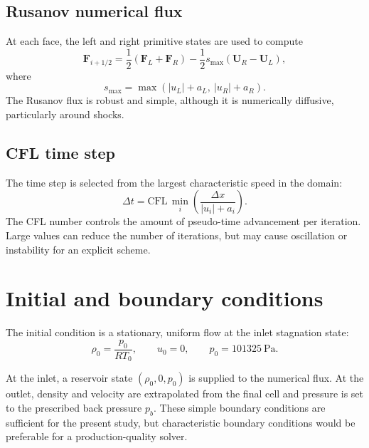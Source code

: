 \documentclass[11pt,a4paper]{article}
\begin{document}
\subsection{Rusanov numerical flux}
At each face, the left and right primitive states are used to compute
\begin{equation}
  \mathbf F_{i+1/2} = \frac{1}{2}
  \left(\mathbf F_L+\mathbf F_R\right)
  -\frac{1}{2}s_{\max}\left(\mathbf U_R-\mathbf U_L\right),
\end{equation}
where
\begin{equation}
  s_{\max}=\max\left(|u_L|+a_L,\ |u_R|+a_R\right).
\end{equation}
The Rusanov flux is robust and simple, although it is numerically diffusive,
particularly around shocks.

\subsection{CFL time step}
The time step is selected from the largest characteristic speed in the domain:
\begin{equation}
  \Delta t = \mathrm{CFL}\,
  \min_i\left(\frac{\Delta x}{|u_i|+a_i}\right).
\end{equation}
The CFL number controls the amount of pseudo-time advancement per iteration.
Large values can reduce the number of iterations, but may cause oscillation or
instability for an explicit scheme.

\section{Initial and boundary conditions}
The initial condition is a stationary, uniform flow at the inlet stagnation
state:
\begin{equation}
  \rho_0=\frac{p_0}{RT_0},\qquad u_0=0,\qquad p_0=101325\ \mathrm{Pa}.
\end{equation}

At the inlet, a reservoir state $(\rho_0,0,p_0)$ is supplied to the numerical
flux. At the outlet, density and velocity are extrapolated from the final cell
and pressure is set to the prescribed back pressure $p_b$. These simple boundary
conditions are sufficient for the present study, but characteristic boundary
conditions would be preferable for a production-quality solver.
\end{document}

